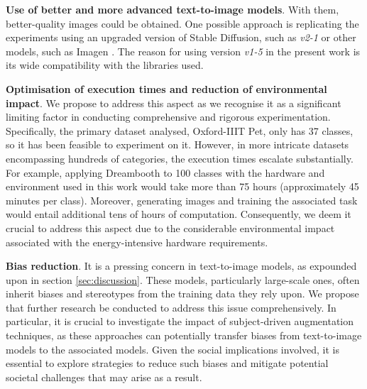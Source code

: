 \textbf{Use of better and more advanced text-to-image models}. With them, better-quality images could be obtained. One possible approach is replicating the experiments using an upgraded version of Stable Diffusion, such as \textit{v2-1} or other models, such as Imagen \cite{saharia2022photorealistic}. The reason for using version \textit{v1-5} in the present work is its wide compatibility with the libraries used.

\textbf{Optimisation of execution times and reduction of environmental impact}. We propose to address this aspect as we recognise it as a significant limiting factor in conducting comprehensive and rigorous experimentation. Specifically, the primary dataset analysed, Oxford-IIIT Pet, only has 37 classes, so it has been feasible to experiment on it. However, in more intricate datasets encompassing hundreds of categories, the execution times escalate substantially. For example, applying Dreambooth to 100 classes with the hardware and environment used in this work would take more than 75 hours (approximately 45 minutes per class). Moreover, generating images and training the associated task would entail additional tens of hours of computation. Consequently, we deem it crucial to address this aspect due to the considerable environmental impact associated with the energy-intensive hardware requirements.

\textbf{Bias reduction}. It is a pressing concern in text-to-image models, as expounded upon in section \ref{sec:discussion}. These models, particularly large-scale ones, often inherit biases and stereotypes from the training data they rely upon. We propose that further research be conducted to address this issue comprehensively. In particular, it is crucial to investigate the impact of subject-driven augmentation techniques, as these approaches can potentially transfer biases from text-to-image models to the associated models. Given the social implications involved, it is essential to explore strategies to reduce such biases and mitigate potential societal challenges that may arise as a result.